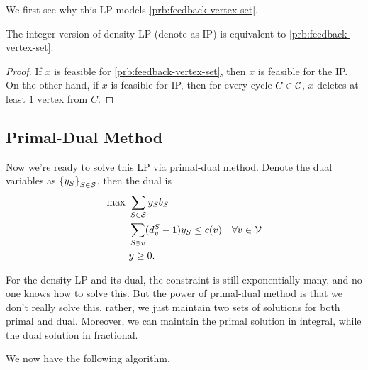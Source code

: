 We first see why this LP models \autoref{prb:feedback-vertex-set}.

\begin{lemma}\label{lma:lec4-1}
	The integer version of density LP (denote as IP) is equivalent to \autoref{prb:feedback-vertex-set}.
\end{lemma}
\begin{proof}
	If \(x\) is feasible for \autoref{prb:feedback-vertex-set}, then \(x\) is feasible for the IP. On the other hand, if \(x\) is feasible for IP, then for every cycle \(C\in \mathcal{\MakeUppercase{C}} \), \(x\) deletes at least \(1\) vertex from \(C\).
\end{proof}

\subsection{Primal-Dual Method}
Now we're ready to solve this LP via primal-dual method. Denote the dual variables as \(\left\{ y_S \right\} _{S\in \mathcal{\MakeUppercase{S}} }\), then the dual is
\begin{align*}
	\max~ & \sum_{S\in \mathcal{\MakeUppercase{S}} } y_S b_S                                       \\
	      & \sum_{S\ni v}(d_{v} ^S - 1)y_S \leq c(v)\quad \forall v\in \mathcal{\MakeUppercase{v}} \\
	      & y\geq 0.
\end{align*}

\begin{note}
	For the density LP and its dual, the constraint is still exponentially many, and no one knows how to solve this. But the power of primal-dual method is that we don't really solve this, rather, we just maintain two sets of solutions for both primal and dual. Moreover, we can maintain the primal solution in integral, while the dual solution in fractional.
\end{note}

We now have the following algorithm.\par

